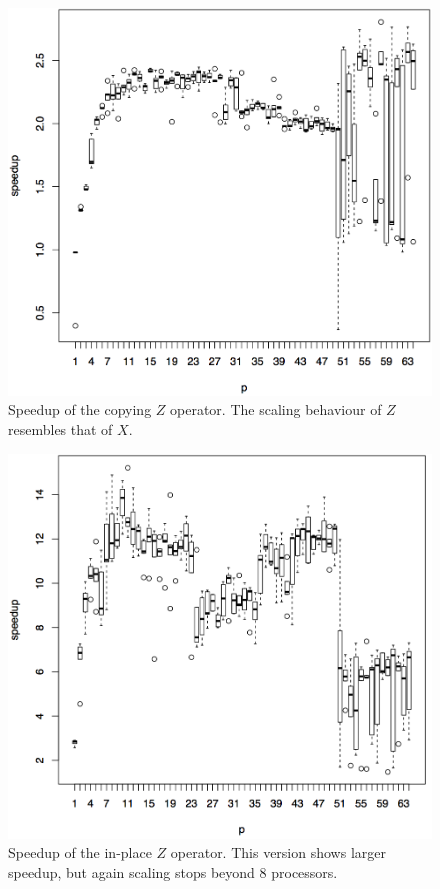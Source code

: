 \documentclass[a4paper,11pt, oneside]{report}
\begin{document}
\begin{figure}[p]
	\centering
	\includegraphics[width=\columnwidth]{sigma-z1.png}
	\caption{Speedup of the copying $Z$ operator. The scaling behaviour of $Z$ resembles that of $X$.}
\end{figure}

\begin{figure}[p]
	\centering
	\includegraphics[width=\columnwidth]{sigma-z2.png}
	\caption{Speedup of the in-place $Z$ operator. This version shows larger speedup, but again scaling stops beyond 8 processors.}
\end{figure}
\end{document}
